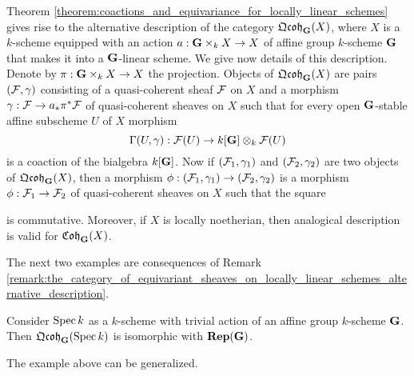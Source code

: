 \begin{remark}\label{remark:the_category_of_equivariant_sheaves_on_locally_linear_schemes_alternative_description}
Theorem \ref{theorem:coactions_and_equivariance_for_locally_linear_schemes} gives rise to the alternative description of the category $\mathfrak{Qcoh}_{\mathbf{G}}(X)$, where $X$ is a $k$-scheme equipped with an action $a:\mathbf{G}\times_kX\rightarrow X$ of affine group $k$-scheme $\mathbf{G}$ that makes it into a $\mathbf{G}$-linear scheme. We give now details of this description. Denote by $\pi:\mathbf{G}\times_kX\rightarrow X$ the projection. Objects of $\mathfrak{Qcoh}_{\mathbf{G}}(X)$ are pairs $({\mathcal F},\gamma)$ consisting of a quasi-coherent sheaf ${\mathcal F}$ on $X$ and a morphism $\gamma:{\mathcal F}\rightarrow a_*\pi^*{\mathcal F}$ of quasi-coherent sheaves on $X$ such that for every open $\mathbf{G}$-stable affine subscheme $U$ of $X$ morphism
$$\Gamma(U,\gamma):{\mathcal F}(U)\rightarrow k[\mathbf{G}]\otimes_k{\mathcal F}(U)$$
is a coaction of the bialgebra $k[\mathbf{G}]$. Now if $({\mathcal F}_1,\gamma_1)$ and $({\mathcal F}_2,\gamma_2)$ are two objects of $\mathfrak{Qcoh}_{\mathbf{G}}(X)$, then a morphism $\phi:({\mathcal F}_1,\gamma_1)\rightarrow ({\mathcal F}_2,\gamma_2)$ is a morphism $\phi:{\mathcal F}_1\rightarrow {\mathcal F}_2$ of quasi-coherent sheaves on $X$ such that the square
\begin{center}
\end{center}
is commutative. Moreover, if $X$ is locally noetherian, then analogical description is valid for $\mathfrak{Coh}_{\mathbf{G}}(X)$.
\end{remark}
\noindent
The next two examples are consequences of Remark \ref{remark:the_category_of_equivariant_sheaves_on_locally_linear_schemes_alternative_description}. 

\begin{example}\label{example:equivariant_objects_on_point}
Consider $\mathrm{Spec}\, k$ as a $k$-scheme with trivial action of an affine group $k$-scheme $\mathbf{G}$. Then $\mathfrak{Qcoh}_{\mathbf{G}}(\mathrm{Spec}\, k)$ is isomorphic with $\mathbf{Rep}(\mathbf{G})$.
\end{example}
\noindent
The example above can be generalized.


